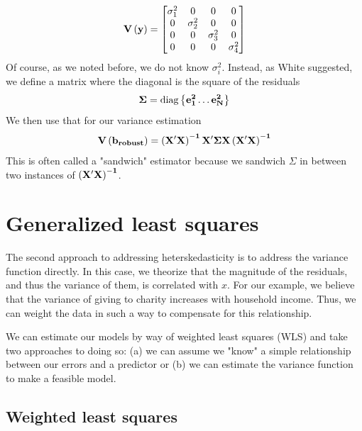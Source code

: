 \[
\bf V\left(y\right) =
\begin{bmatrix}
\sigma_1^2&0&0&0 \\
0&\sigma_2^2&0&0 \\
0&0&\sigma_3^2&0 \\
0&0&0&\sigma_4^2 \\
\end{bmatrix}
\]
Of course, as we noted before, we do not know $\sigma_i^2$. Instead, as White suggested, we define a matrix where the diagonal is the square of the residuals
\begin{equation}
\bf \Sigma=\mbox{diag}\left\{e_1^2\ldots e_N^2\right\}
\end{equation}
We then use that for our variance estimation
\begin{equation}
\bf V\left(b_{robust}\right)=\left(X'X\right)^{-1}X'\Sigma X\left(X'X\right)^{-1}
\end{equation}
This is often called a "sandwich" estimator because we sandwich $\Sigma$ in between two instances of $\bf \left(X'X\right)^{-1}$.

\section{Generalized least squares}
\label{sec:glmintro}

The second approach to addressing heterskedasticity is to address the variance function directly. In this case, we theorize that the magnitude of the residuals, and thus the variance of them, is correlated with $x$. For our example, we believe that the variance of giving to charity increases with household income. Thus, we can weight the data in such a way to compensate for this relationship.

We can estimate our models by way of weighted least squares (WLS) and take two approaches to doing so: (a) we can assume we "know" a simple relationship between our errors and a predictor or (b) we can estimate the variance function to make a feasible model.

\subsection{Weighted least squares}

